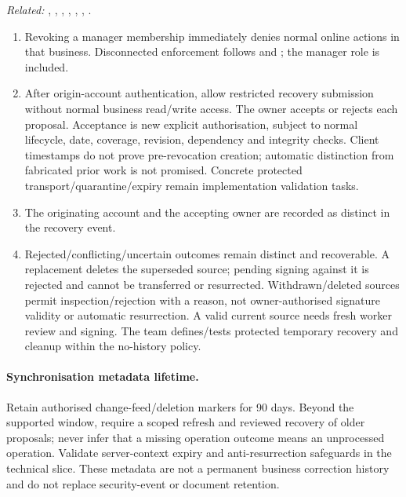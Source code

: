 \textit{Related:} \hyperref[fr:003]{}, \hyperref[fr:004]{}, \hyperref[fr:008]{}, \hyperref[fr:037]{}, \hyperref[fr:041]{}, \hyperref[fr:043]{}, \hyperref[fr:045]{}.
\begin{enumerate}[label=(\alph*),leftmargin=*,itemsep=1pt,topsep=3pt]
\item Revoking a manager membership immediately denies normal online actions in that business. Disconnected enforcement follows \hyperref[br:002]{} and \hyperref[nfr:AOC-02]{}; the manager role is included.
\item After origin-account authentication, allow restricted recovery submission without normal business read/write access. The owner accepts or rejects each proposal. Acceptance is new explicit authorisation, subject to normal lifecycle, date, coverage, revision, dependency and integrity checks. Client timestamps do not prove pre-revocation creation; automatic distinction from fabricated prior work is not promised. Concrete protected transport/quarantine/expiry remain implementation validation tasks.
\item The originating account and the accepting owner are recorded as distinct in the recovery event.
\item Rejected/conflicting/uncertain outcomes remain distinct and recoverable. A replacement deletes the superseded source; pending signing against it is rejected and cannot be transferred or resurrected. Withdrawn/deleted sources permit inspection/rejection with a reason, not owner-authorised signature validity or automatic resurrection. A valid current source needs fresh worker review and signing. The team defines/tests protected temporary recovery and cleanup within the no-history policy.
\end{enumerate}

\paragraph{Synchronisation metadata lifetime.}
Retain authorised change-feed/deletion markers for 90 days. Beyond the supported
window, require a scoped refresh and reviewed recovery of older proposals; never
infer that a missing operation outcome means an unprocessed operation. Validate
server-context expiry and anti-resurrection safeguards in the technical slice.
These metadata are not a permanent business correction history and do not replace
security-event or document retention.
